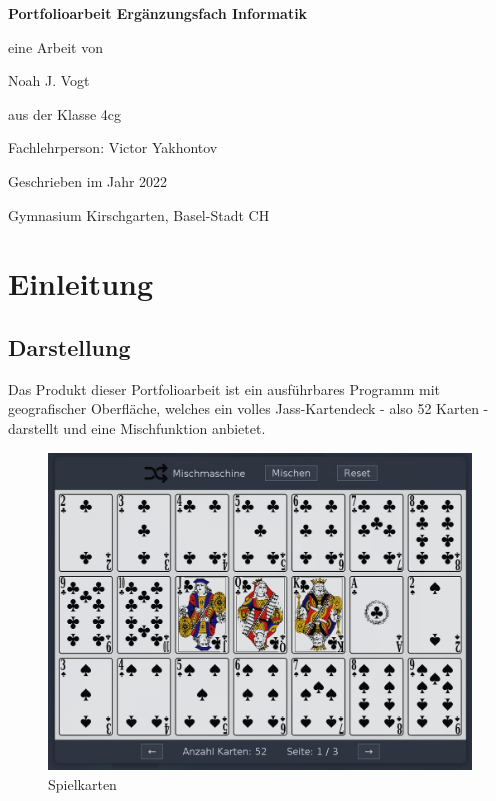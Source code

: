 \documentclass[a4paper,11pt]{article}
\begin{document}
\begin{titlepage}

	\centering

    \vspace{5cm}
    \vspace{0.1cm}
	{\huge\bfseries Portfolioarbeit Ergänzungsfach Informatik \par}
	\vspace{0.5cm}
	{\Large eine Arbeit von \par}
	{\Large Noah J. Vogt \par}
    {\Large aus der Klasse 4cg \par}
    \vspace{0.5cm}


    \vspace{0.5cm}
    {\Large Fachlehrperson: Victor Yakhontov \par }
    \vspace{0.5cm}
	{\large Geschrieben im Jahr 2022 \par}
    {\large Gymnasium Kirschgarten, Basel-Stadt CH \par}

\end{titlepage}

\tableofcontents
\pagebreak

\section{Einleitung}
\subsection{Darstellung}
Das Produkt dieser Portfolioarbeit ist ein ausführbares Programm mit geografischer Oberfläche, welches ein volles Jass-Kartendeck - also 52 Karten - darstellt und eine Mischfunktion anbietet.\\

\begin{figure}[H]
    \centering
    \includegraphics[width=.7\textwidth]{media/early-screenshot.jpg}
    \caption{Spielkarten}
\end{figure}
\end{document}
